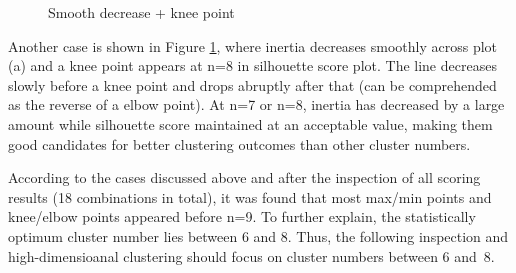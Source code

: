 \documentclass[a4paper]{article}
\begin{document}
\begin{figure}[H]
    \centering
    \caption{Smooth decrease + knee point}
    \label{fig: kPCA_poly_kmedoids}
\end{figure}

Another case is shown in Figure \ref{fig: kPCA_poly_kmedoids}, where inertia decreases smoothly across plot (a) and a knee point appears at n=8 in silhouette score plot. The line decreases slowly before a knee point and drops abruptly after that (can be comprehended as the reverse of a elbow point). At n=7 or n=8, inertia has decreased by a large amount while silhouette score maintained at an acceptable value, making them good candidates for better clustering outcomes than other cluster numbers.

According to the cases discussed above and after the inspection of all scoring results (18 combinations in total), it was found that most max/min points and knee/elbow points appeared before n=9. To further explain, the statistically optimum cluster number lies between 6 and 8. Thus, the following inspection and high-dimensioanal clustering should focus on cluster numbers between 6 and~8.
\end{document}
